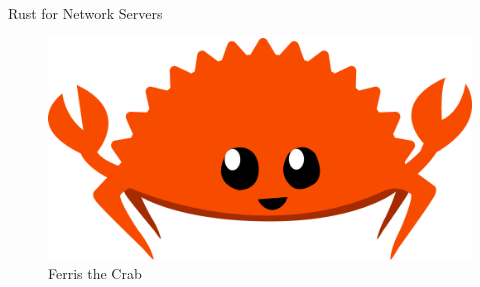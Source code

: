 \begin{frame}{Rust for Network Servers}
    \begin{figure}
        \includegraphics[width=0.6\linewidth]{images/ferris.png}
        \caption{Ferris the Crab \cite{ferris}}
    \end{figure}
\end{frame}
